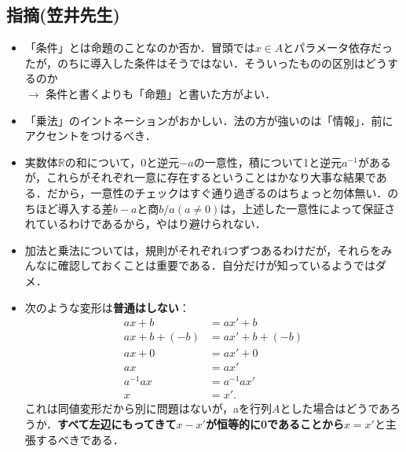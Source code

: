 \documentclass[dvipdfmx,11pt]{jsarticle}
\begin{document}
\subsection*{指摘(笠井先生)}
\begin{itemize}
    \item 「条件」とは命題のことなのか否か．冒頭では$x \in A$とパラメータ依存だったが，のちに導入した条件はそうではない．そういったものの区別はどうするのか\\
    $\longrightarrow$ 条件と書くよりも「命題」と書いた方がよい．
    \item 「乗法」のイントネーションがおかしい．法の方が強いのは「情報」．前にアクセントをつけるべき．
    \item 実数体$\mathbb{R}$の和について，0と逆元$-a$の一意性，積について1と逆元$a^{-1}$があるが，これらがそれぞれ一意に存在するということはかなり大事な結果である．だから，一意性のチェックはすぐ通り過ぎるのはちょっと勿体無い．のちほど導入する差$b-a$と商$b/a (a \neq 0)$は，上述した一意性によって保証されているわけであるから，やはり避けられない．
    \item 加法と乗法については，規則がそれぞれ4つずつあるわけだが，それらをみんなに確認しておくことは重要である．自分だけが知っているようではダメ．
    \item 次のような変形は\textbf{普通はしない}：
        \begin{align*}
            ax + b &= ax' + b \\
            ax + b + (-b) &= ax' + b + (-b) \\
            ax + 0 &= ax' + 0 \\
            ax &= ax' \\
            a^{-1} ax &= a^{-1} ax' \\
            x &= x'.
        \end{align*}
        これは同値変形だから別に問題はないが，aを行列$A$とした場合はどうであろうか．\textbf{すべて左辺にもってきて$x-x'$が恒等的に0であることから}$x=x'$と主張するべきである．
\end{itemize}
\end{document}
